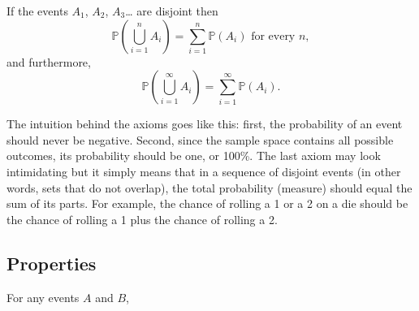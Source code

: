 \begin{ax}
\label{ax-countable-additivity} If the events \(A_{1}\), \(A_{2}\),
\(A_{3}\)\ldots{} are disjoint then
\begin{equation}
\mathbb{P}\left(\bigcup_{i=1}^{n}A_{i}\right)=\sum_{i=1}^{n}\mathbb{P}(A_{i})\mbox{ for every }n,
\end{equation}
and furthermore,
\begin{equation}
\mathbb{P}\left(\bigcup_{i=1}^{\infty}A_{i}\right)=\sum_{i=1}^{\infty}\mathbb{P}(A_{i}).
\end{equation}
\end{ax}

The intuition behind the axioms goes like this: first, the probability
of an event should never be negative. Second, since the sample space
contains all possible outcomes, its probability should be one, or
100\%. The last axiom may look intimidating but it simply means that in
a sequence of disjoint events (in other words, sets that do not
overlap), the total probability (measure) should equal the sum of its
parts. For example, the chance of rolling a 1 or a 2 on a die should
be the chance of rolling a 1 plus the chance of rolling a 2.

\subsection{Properties}
\label{sec-4-4-2}

For any events \(A\) and \(B\),

